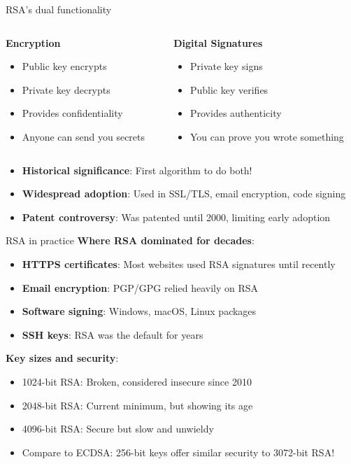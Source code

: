 \documentclass[aspectratio=169, lualatex, handout]{beamer}
\begin{document}
\begin{frame}{RSA's dual functionality}
	\begin{columns}[c]
		\begin{column}{0.5\textwidth}
			\textbf{Encryption}
			\begin{itemize}[<+->]
				\item Public key encrypts
				\item Private key decrypts
				\item Provides confidentiality
				\item Anyone can send you secrets
			\end{itemize}
		\end{column}
		\begin{column}{0.5\textwidth}
			\textbf{Digital Signatures}
			\begin{itemize}[<+->]
				\item Private key signs
				\item Public key verifies
				\item Provides authenticity
				\item You can prove you wrote something
			\end{itemize}
		\end{column}
	\end{columns}
	\vspace{0.5cm}
	\begin{itemize}[<+->]
		\item \textbf{Historical significance}: First algorithm to do both!
		\item \textbf{Widespread adoption}: Used in SSL/TLS, email encryption, code signing
		\item \textbf{Patent controversy}: Was patented until 2000, limiting early adoption
	\end{itemize}
\end{frame}

\begin{frame}{RSA in practice}
	\textbf{Where RSA dominated for decades}:
	\begin{itemize}[<+->]
		\item \textbf{HTTPS certificates}: Most websites used RSA signatures until recently
		\item \textbf{Email encryption}: PGP/GPG relied heavily on RSA
		\item \textbf{Software signing}: Windows, macOS, Linux packages
		\item \textbf{SSH keys}: RSA was the default for years
	\end{itemize}
	\vspace{0.5cm}
	\textbf{Key sizes and security}:
	\begin{itemize}[<+->]
		\item 1024-bit RSA: Broken, considered insecure since 2010
		\item 2048-bit RSA: Current minimum, but showing its age
		\item 4096-bit RSA: Secure but slow and unwieldy
		\item Compare to ECDSA: 256-bit keys offer similar security to 3072-bit RSA!
	\end{itemize}
\end{frame}
\end{document}
